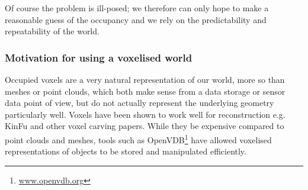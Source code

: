 \documentclass[10pt,twocolumn,letterpaper]{article}
\makeatletter
\renewcommand*{\eg}{e.g.\@\xspace}
\makeatother
\begin{document}
Of course the problem is ill-posed; we therefore can only hope to make a reasonable guess of the occupancy and we rely on the predictability and repeatability of the world.





\subsubsection{Motivation for using a voxelised world}

Occupied voxels are a very natural representation of our world, more so than meshes or point clouds, which both make sense from a data storage or sensor data point of view, but do not actually represent the underlying geometry particularly well.
Voxels have been shown to work well for reconstruction \eg KinFu and other voxel carving papers. 
While they be expensive compared to point clouds and meshes, tools such as OpenVDB\footnote{\url{www.openvdb.org}} have allowed voxelised representations of objects to be stored and manipulated efficiently.





\end{document}
